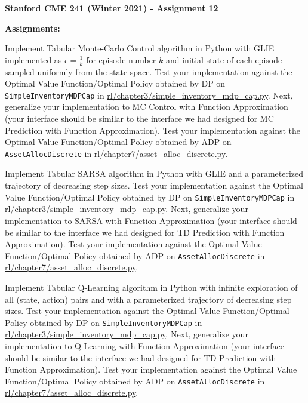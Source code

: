 \documentclass[12pt]{exam}
\begin{document}
\begin{center}
{\large {\bf Stanford CME 241 (Winter 2021) - Assignment 12}}
\end{center}
 
{\large{\bf Assignments:}}
\begin{questions}

\question Implement Tabular Monte-Carlo Control algorithm in Python with GLIE implemented as $\epsilon = \frac 1 k$ for episode number $k$ and initial state of each episode sampled uniformly from the state space. Test your implementation against the Optimal Value Function/Optimal Policy obtained by DP on \lstinline{SimpleInventoryMDPCap} in \href{https://github.com/TikhonJelvis/RL-book/blob/master/rl/chapter3/simple_inventory_mdp_cap.py}{rl\//chapter3\//simple\_inventory\_mdp\_cap.py}. Next, generalize your implementation to MC Control with Function Approximation (your interface should be similar to the interface we had designed for MC Prediction with Function Approximation). Test your implementation against the Optimal Value Function/Optimal Policy obtained by ADP on \lstinline{AssetAllocDiscrete} in \href{https://github.com/TikhonJelvis/RL-book/blob/master/rl/chapter7/asset_alloc_discrete.py}{rl\//chapter7\//asset\_alloc\_discrete.py}.

\question Implement Tabular SARSA algorithm in Python with GLIE and a parameterized trajectory of decreasing step sizes. Test your implementation against the Optimal Value Function/Optimal Policy obtained by DP on \lstinline{SimpleInventoryMDPCap} in \href{https://github.com/TikhonJelvis/RL-book/blob/master/rl/chapter3/simple_inventory_mdp_cap.py}{rl\//chapter3\//simple\_inventory\_mdp\_cap.py}. Next, generalize your implementation to SARSA with Function Approximation (your interface should be similar to the interface we had designed for TD Prediction with Function Approximation). Test your implementation against the Optimal Value Function/Optimal Policy obtained by ADP on \lstinline{AssetAllocDiscrete} in \href{https://github.com/TikhonJelvis/RL-book/blob/master/rl/chapter7/asset_alloc_discrete.py}{rl\//chapter7\//asset\_alloc\_discrete.py}.

\question Implement Tabular Q-Learning algorithm in Python with infinite exploration of all (state, action) pairs and with a parameterized trajectory of decreasing step sizes. Test your implementation against the Optimal Value Function/Optimal Policy obtained by DP on \lstinline{SimpleInventoryMDPCap} in \href{https://github.com/TikhonJelvis/RL-book/blob/master/rl/chapter3/simple_inventory_mdp_cap.py}{rl\//chapter3\//simple\_inventory\_mdp\_cap.py}. Next, generalize your implementation to Q-Learning with Function Approximation (your interface should be similar to the interface we had designed for TD Prediction with Function Approximation). Test your implementation against the Optimal Value Function/Optimal Policy obtained by ADP on \lstinline{AssetAllocDiscrete} in \href{https://github.com/TikhonJelvis/RL-book/blob/master/rl/chapter7/asset_alloc_discrete.py}{rl\//chapter7\//asset\_alloc\_discrete.py}.


\end{questions}
\end{document}
